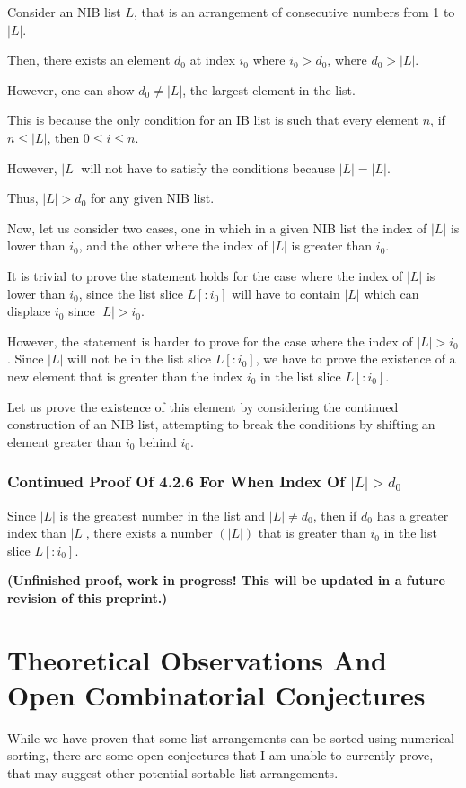 \documentclass[12pt]{article}
\begin{document}
Consider an NIB list $L$, that is an arrangement of consecutive numbers from 1 to $|L|$.

Then, there exists an element $d_0$ at index $i_0$ where $i_0>d_0$, where $d_0>|L|$.

However, one can show $d_0 \neq |L|$, the largest element in the list.

This is because the only condition for an IB list is such that every element $n$, if $n \leq |L|$, then $0 \leq i \leq n$.

However, $|L|$ will not have to satisfy the conditions because $|L|=|L|$.

Thus, $|L| > d_0$ for any given NIB list.

Now, let us consider two cases, one in which in a given NIB list the index of $|L|$ is lower than $i_0$, and the other where the index of $|L|$ is greater than $i_0$.

It is trivial to prove the statement holds for the case where the index of $|L|$ is lower than $i_0$, since the list slice $L[:i_0]$ will have to contain $|L|$ which can displace $i_0$ since $|L|>i_0$.

However, the statement is harder to prove for the case where the index of $|L|>i_0$. Since $|L|$ will not be in the list slice $L[:i_0]$, we have to prove the existence of a new element that is greater than the index $i_0$ in the list slice $L[:i_0]$.

Let us prove the existence of this element by considering the continued construction of an NIB list, attempting to break the conditions by shifting an element greater than $i_0$ behind $i_0$.

\subsubsection{Continued Proof Of 4.2.6 For When Index Of $|L| > d_0$}

Since $|L|$ is the greatest number in the list and $|L| \neq d_0$, then if $d_0$ has a greater index than $|L|$, there exists a number $(|L|)$ that is greater than $i_0$ in the list slice $L[:i_0]$.

\textbf{(Unfinished proof, work in progress! This will be updated in a future revision of this preprint.)}

\section{Theoretical Observations And Open Combinatorial Conjectures}
While we have proven that some list arrangements can be sorted using numerical sorting, there are some open conjectures that I am unable to currently prove, that may suggest other potential sortable list arrangements.
\end{document}
